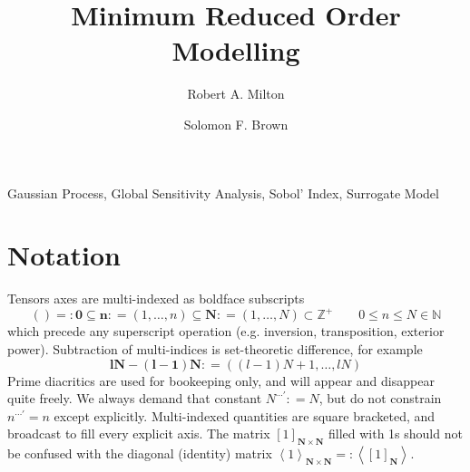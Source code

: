 \documentclass[preprint,12pt]{elsarticle}
\newcommand*{\M}[1]{\ensuremath{#1}\xspace}
\newcommand*{\x}{\times}
\newcommand*{\mi}[1]{\mathbf{#1}}
\newcommand*{\st}[1]{\mathbb{#1}}
\newcommand*{\te}[2][]{\left\lbrack{#2}\right\rbrack_{#1}}
\newcommand*{\diag}[2][]{\left\langle{#2}\right\rangle_{#1}}
\newcommand*{\deq}{\M{\mathrel{\mathop:}=}}
\newcommand*{\deqr}{\M{=\mathrel{\mathop:}}}
\begin{document}
\begin{frontmatter}

    \title{Minimum  Reduced Order Modelling}

    \author{Robert A. Milton}

    \author{Solomon F. Brown}

    \address{Department of Chemical and Biological Engineering, University of Sheffield, Sheffield, S1 3JD, United Kingdom}       

    \begin{abstract}

    \end{abstract}

    \begin{keyword}
        Gaussian Process, Global Sensitivity Analysis, Sobol' Index, Surrogate Model
    \end{keyword}

\end{frontmatter}


\section{Notation} \label{sec:Notation}
    Tensors axes are multi-indexed as boldface subscripts 
    \begin{equation*}
        () \deqr \mi{0} \subseteq\mi{n} \deq(1,\ldots,n) \subseteq \mi{N}\deq(1,\ldots,N)\subset\st{Z}^{+} \qquad 0 \leq n \leq N \in \st{N}
    \end{equation*}
    which precede any superscript operation (e.g. inversion, transposition, exterior power).
    Subtraction of multi-indices is set-theoretic difference, for example
    \begin{equation*}
        \mi{lN}-\mi{(l-1)N} \deq ((l-1)N+1,\ldots,lN) 
    \end{equation*}
    Prime diacritics are used for bookeeping only, and will appear and disappear quite freely. We always demand that constant $N^{\cdots\prime} \deq N$, but do not constrain $n^{\cdots\prime} = n$ except explicitly. 
    Multi-indexed quantities are square bracketed, and broadcast to fill every explicit axis. The matrix $\te[\mi{N} \x \mi{N}]{1}$ filled with 1s should not be confused with the diagonal (identity) matrix $\diag[\mi{N}\x\mi{N}]{1} \deqr \diag{\te[\mi{N}]{1}}$. 
    
\end{document}
